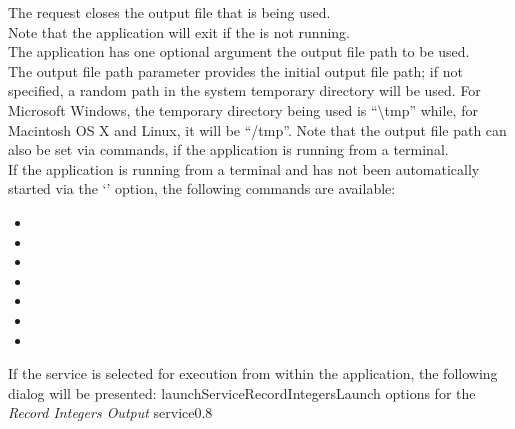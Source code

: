 The  request closes the output
file that is being used.\\

Note that the application will exit if the  is not
running.\\

The application has one optional argument \longDash{} the output file path to be used.
\insertAppParameters
{}
\insertOutputServiceComment\\

The output file path parameter provides the initial output file path; if not specified, a
random path in the system temporary directory will be used.
For Microsoft Windows, the temporary directory being used is ``\textbackslash{}tmp''
while, for Macintosh OS X and Linux, it will be ``/tmp''.
Note that the output file path can also be set via commands, if the application is
running from a terminal.\\

If the application is running from a terminal and has not been automatically started via
the `' option, the following commands are available:
\begin{itemize}
\item{}
\item\exSp{}
\item\exSp{}
\item\exSp{}
\item\exSp{}
\item\exSp{}
\item\exSp{}
\end{itemize}
\condPage
If the service is selected for execution from within the \emph{\CMU} application, the
following dialog will be presented:
%
{launchServiceRecordIntegers}{Launch options for the \emph{Record Integers Output}
service}{0.8}

